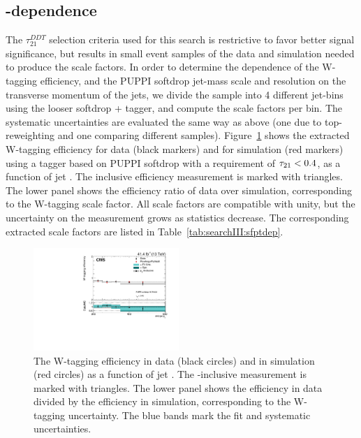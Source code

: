 \subsection{\PT-dependence}
The $\tau_{21}^{DDT}$ selection criteria used for this search is restrictive to favor better signal significance, but results in small event samples of the data and simulation needed to produce the scale factors. In order to determine the dependence of the W-tagging efficiency, and the PUPPI softdrop jet-mass scale and resolution on the transverse momentum of the jets, we divide the sample into 4 different jet-\PT bins using the looser softdrop + \nsubj tagger, and compute the scale factors per bin. The systematic uncertainties are evaluated the same way as above (one due to top-\PT reweighting and one comparing different \ttbar samples). Figure~\ref{fig:searchIII:sfvspt} shows the extracted W-tagging efficiency for data (black markers) and for simulation (red markers) using a tagger based on PUPPI softdrop with a requirement of $\tau_{21}<0.4$, as a function of jet \PT. The inclusive efficiency measurement is marked with triangles. The lower panel shows the efficiency ratio of data over simulation, corresponding to the W-tagging scale factor. All scale factors are compatible with unity, but the uncertainty on the measurement grows as statistics decrease. The corresponding extracted scale factors are listed in Table~\ref{tab:searchIII:sfptdep}.
 \begin{figure}[h!]
 \centering
 \includegraphics[width=0.49\textwidth]{figures/vtagging/2017_sf/sd_vPt.pdf}
 \caption{The W-tagging efficiency in data (black circles) and in simulation (red circles) as a function of jet \PT. The \PT-inclusive measurement is marked with triangles. The lower panel shows the efficiency in data divided by the efficiency in simulation, corresponding to the W-tagging uncertainty. The blue bands mark the fit and systematic uncertainties.}
 \label{fig:searchIII:sfvspt}
 \end{figure}
